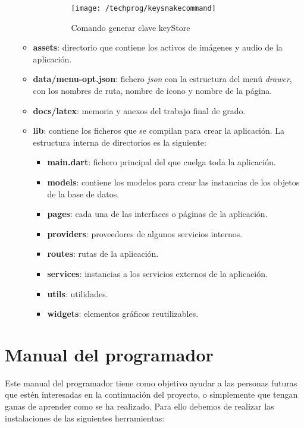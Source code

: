 \begin{itemize}
\begin{itemize}
\begin{itemize}
		\begin{figure}[H]
			\centering
			\texttt{[image: /techprog/keysnakecommand]}
			\caption{Comando generar clave keyStore}
			\label{fig:commandkey}
		\end{figure}	 
	\end{itemize}
	\item \textbf{assets}: directorio que contiene los activos de imágenes y audio de la aplicación. 
	\item \textbf{data/menu-opt.json}: fichero \emph{json} con la estructura del menú \emph{drawer}, con los nombres de ruta, nombre de icono y nombre de la página. 
	\item \textbf{docs/latex}: memoria y anexos del trabajo final de grado.
	\item \textbf{lib}: contiene los ficheros que se compilan para crear la aplicación. La estructura interna de directorios es la siguiente:
	\begin{itemize}
		\item \textbf{main.dart}: fichero principal del que cuelga toda la aplicación.
		\item \textbf{models}: contiene los modelos para crear las instancias de los objetos de la base de datos.
		\item \textbf{pages}: cada una de las interfaces o páginas de la aplicación.
		\item \textbf{providers}: proveedores de algunos servicios internos.
		\item \textbf{routes}: rutas de la aplicación.
		\item \textbf{services}: instancias a los servicios externos de la aplicación.
		\item \textbf{utils}: utilidades.
		\item \textbf{widgets}: elementos gráficos reutilizables.
		 
	\end{itemize}
\end{itemize}
\end{itemize}

\section{Manual del programador}
Este manual del programador tiene como objetivo ayudar a las personas futuras que estén interesadas en la continuación del proyecto, o simplemente que tengan ganas de aprender como se ha realizado. Para ello debemos de realizar las instalaciones de las siguientes herramientas:

